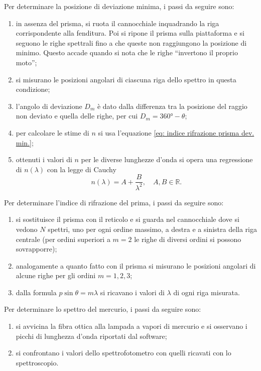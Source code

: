 Per determinare la posizione di deviazione minima, i passi da seguire sono:
\begin{enumerate}
    \item in assenza del prisma, si ruota il cannocchiale inquadrando la riga corrispondente alla fenditura. Poi si ripone il prisma sulla piattaforma e si seguono le righe spettrali fino a che queste non raggiungono la posizione di minimo. Questo accade quando si nota che le righe ``invertono il proprio moto'';
    \item si misurano le posizioni angolari di ciascuna riga dello spettro in questa condizione;
    \item l'angolo di deviazione $D_m$ è dato dalla differenza tra la posizione del raggio non deviato e quella delle righe, per cui $D_m=\ang{360}-\theta$;
    \item per calcolare le stime di $n$ si usa l'equazione \eqref{eq: indice rifrazione prisma dev. min.};
    \item ottenuti i valori di $n$ per le diverse lunghezze d'onda si opera una regressione di $n(\lambda)$ con la legge di Cauchy
    \begin{equation}
        n(\lambda)=A+\frac{B}{\lambda^2},\quad A,B\in\mathbb{R}.
    \end{equation}
\end{enumerate}
Per determinare l'indice di rifrazione del prima, i passi da seguire sono:
    \begin{enumerate}
        \item si sostituisce il prisma con il reticolo e si guarda nel cannocchiale dove si vedono $N$ spettri, uno per ogni ordine massimo, a destra e a sinistra della riga centrale (per ordini superiori a $m=2$ le righe di diversi ordini si possono sovrapporre);
        \item analogamente a quanto fatto con il prisma si misurano le posizioni angolari di alcune righe per gli ordini $m=1,2,3$;
        \item dalla formula $p\sin{\theta}=m\lambda$ si ricavano i valori di $\lambda$ di ogni riga misurata.
    \end{enumerate}
Per determinare lo spettro del mercurio, i passi da seguire sono:
    \begin{enumerate}
        \item si avvicina la fibra ottica alla lampada a vapori di mercurio e si osservano i picchi di lunghezza d'onda riportati dal software;
        \item si confrontano i valori dello spettrofotometro con quelli ricavati con lo spettroscopio.
    \end{enumerate}
